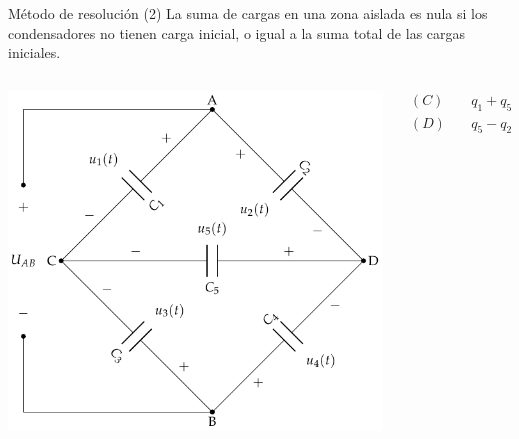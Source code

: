 \documentclass[aspectratio=169, usenames,svgnames,dvipsnames]{beamer}
\begin{document}
\begin{frame}[label={sec:org4c16950}]{Método de resolución (2)}
La suma de cargas en una zona aislada es nula si los condensadores no tienen carga inicial, o igual a la suma total de las cargas iniciales.
\begin{columns}
\begin{column}{0.5\columnwidth}
\begin{center}
\includegraphics[height=0.75\textheight]{../figs/CondensadoresZonaAislada_Tensiones.pdf}
\end{center}
\end{column}
\begin{column}{0.5\columnwidth}
\begin{align*}
  (C) &\quad q_1 + q_5 + q_3 = 0\\
  (D) &\quad q_5 - q_2 - q_4 = 0
\end{align*}
\end{column}
\end{columns}
\end{frame}
\end{document}
